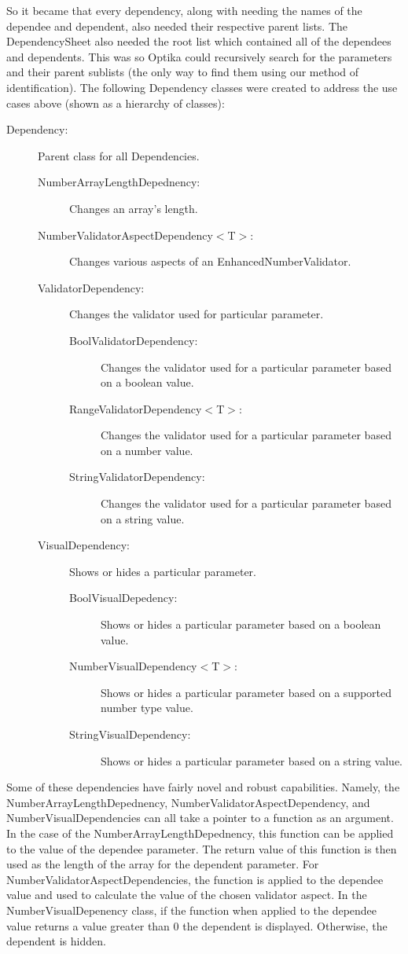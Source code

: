 	So it became that every dependency, along with needing the names of the dependee
	and dependent, also needed their respective parent lists. The DependencySheet also needed the root list which contained all of the dependees and dependents.
	This was so Optika could recursively search for the parameters and their parent sublists (the only way to find them using our method of identification). 
	The following Dependency classes were created to address the use cases above (shown as a hierarchy of classes):
	\begin{description}
		\item[Dependency:] Parent class for all Dependencies.
		\begin{description}
			\item[NumberArrayLengthDepednency:] Changes an array's length.
			\item[NumberValidatorAspectDependency$<$T$>$:] Changes various aspects of an EnhancedNumberValidator.
			\item[ValidatorDependency:] Changes the validator used for particular parameter.
			\begin{description}
				\item[BoolValidatorDependency:]Changes the validator used for a particular parameter based on a boolean value.
				\item[RangeValidatorDependency$<$T$>$:] Changes the validator used for a particular parameter based on a number value.
				\item[StringValidatorDependency:] Changes the validator used for a particular parameter based on a string value.
			\end{description}	
			\item [VisualDependency:] Shows or hides a particular parameter.
			\begin{description}
				\item[BoolVisualDepedency:] Shows or hides a particular parameter based on a boolean value.
				\item[NumberVisualDependency$<$T$>$:] Shows or hides a particular parameter based on a supported number type value.
				\item[StringVisualDependency:] Shows or hides a particular parameter based on a string value.
			\end{description}
		\end{description}
	\end{description}

	Some of these dependencies have fairly novel and robust capabilities. Namely, the NumberArrayLengthDepednency, NumberValidatorAspectDependency, and NumberVisualDependencies
	can all take a pointer to a function as an argument. In the case of the NumberArrayLengthDepednency, this function can be applied to the value of the dependee
	parameter. The return value of this function is then used as the length of the array for the dependent parameter. For NumberValidatorAspectDependencies, the function
	is applied to the dependee value and used to calculate the value of the chosen validator aspect. In the NumberVisualDepenency class, if the function 
	when applied to the dependee value returns a value greater than 0 the dependent is displayed. Otherwise, the dependent is hidden. 

